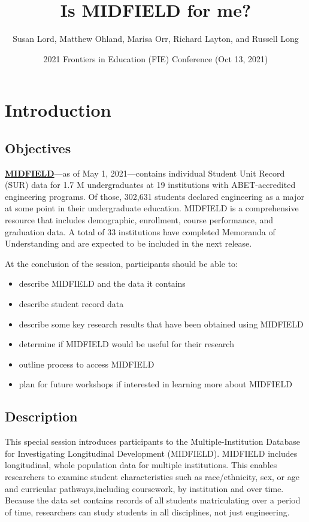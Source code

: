 \documentclass[
]{book}
\title{Is MIDFIELD for me?}
\author{Susan Lord, Matthew Ohland, Marisa Orr, Richard Layton, and Russell Long}
\date{2021 Frontiers in Education (FIE) Conference (Oct 13, 2021)}
\providecommand{\tightlist}{%
  \setlength{\itemsep}{0pt}\setlength{\parskip}{0pt}}
\begin{document}
\maketitle

{
\setcounter{tocdepth}{1}
\tableofcontents
}
\hypertarget{introduction}{%
\chapter{Introduction}\label{introduction}}

\hypertarget{objectives}{%
\section{Objectives}\label{objectives}}

\href{https://engineering.purdue.edu/MIDFIELD}{\textbf{MIDFIELD}}---as of May 1, 2021---contains individual Student Unit Record (SUR) data for 1.7 M undergraduates at 19 institutions with ABET-accredited engineering programs. Of those, 302,631 students declared engineering as a major at some point in their undergraduate education. MIDFIELD is a comprehensive resource that includes demographic, enrollment, course performance, and graduation data. A total of 33 institutions have completed Memoranda of Understanding and are expected to be included in the next release.

At the conclusion of the session, participants should be able
to:

\begin{itemize}
\tightlist
\item
  describe MIDFIELD and the data it contains
\item
  describe student record data
\item
  describe some key research results that have been obtained using MIDFIELD
\item
  determine if MIDFIELD would be useful for their research
\item
  outline process to access MIDFIELD
\item
  plan for future workshops if interested in learning more about MIDFIELD
\end{itemize}

\hypertarget{description}{%
\section{Description}\label{description}}

This special session introduces participants to the Multiple-Institution Database for Investigating Longitudinal Development (MIDFIELD). MIDFIELD includes longitudinal, whole population data for multiple institutions. This enables researchers to examine student characteristics such as race/ethnicity, sex, or age and curricular pathways,including coursework, by institution and over time. Because the data set contains records of all students matriculating over a period of time, researchers can study students in all disciplines, not just engineering.
\end{document}

